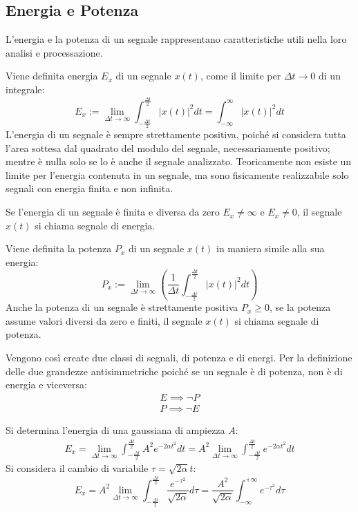 \documentclass{article}
\numberwithin{equation}{subsection}
\begin{document}
\subsection{Energia e Potenza}

L'energia e la potenza di un segnale rappresentano caratteristiche utili nella loro analisi e processazione. 

Viene definita energia $E_x$ di un segnale $x(t)$, come il limite per $\Delta t\to0$ di un integrale:
\begin{equation}
    E_x:=\lim_{\Delta t\to\infty}\displaystyle\int_{-\frac{\Delta t}{2}}^{\frac{\Delta t}{2}}|x(t)|^2dt=\int_{-\infty}^{\infty}|x(t)|^2dt
\end{equation}
L'energia di un segnale è sempre strettamente positiva, poiché si considera tutta l'area sottesa dal quadrato del modulo del segnale, necessariamente positivo; mentre è nulla 
solo se lo è anche il segnale analizzato. Teoricamente non esiste un limite per l'energia contenuta in un segnale, ma sono fisicamente realizzabile solo segnali con energia 
finita e non infinita. 

Se l'energia di un segnale è finita e diversa da zero $E_x\neq\infty$ e $E_x\neq0$, il segnale $x(t)$ si chiama segnale di energia.


Viene definita la potenza $P_x$ di un segnale $x(t)$ in maniera simile alla sua energia:
\begin{equation}
    P_x:=\lim_{\Delta t\to\infty}\displaystyle\left(\frac{1}{\Delta t}\int_{-\frac{\Delta t}{2}}^{\frac{\Delta t}{2}}|x(t)|^2dt\right)
\end{equation}
Anche la potenza di un segnale è strettamente positiva $P_x\geq0$, se la potenza assume valori diversi da zero e finiti, il segnale $x(t)$ si chiama segnale di potenza. 

Vengono così create due classi di segnali, di potenza e di energi. Per la definizione delle due grandezze antisimmetriche poiché se un segnale è di potenza, non è di energia 
e viceversa: 
\begin{gather*}
    E\implies\neg P\\
    P\implies\neg E
\end{gather*}

Si determina l'energia di una gaussiana di ampiezza $A$:
\begin{gather*}
    E_x=\lim_{\Delta t\to\infty}\displaystyle\int_{-\frac{\Delta t}{2}}^{\frac{\Delta t}{2}}A^2e^{-2\alpha t^2}dt=A^2\lim_{\Delta t\to\infty}\displaystyle\int_{-\frac{\Delta t}{2}}^{\frac{\Delta t}{2}}e^{-2\alpha t^2}dt
\end{gather*}
Si considera il cambio di variabile $\tau=\sqrt{2\alpha}t$:
\begin{equation*}
    E_x=A^2\lim_{\Delta t\to\infty}\displaystyle\int_{-\frac{\Delta t}{2}}^{\frac{\Delta t}{2}}\frac{e^{-\tau^2}}{\sqrt{2\alpha}}d\tau=\frac{A^2}{\sqrt{2\alpha}}\int_{-\infty}^{+\infty}e^{-\tau^2}d\tau
\end{equation*}
\end{document}
